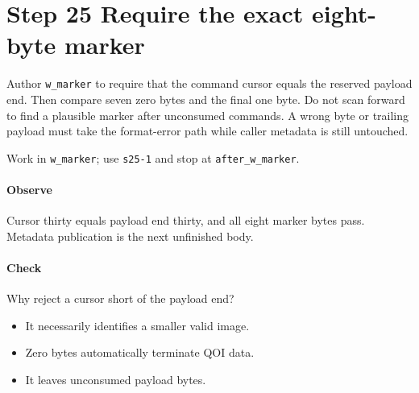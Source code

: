 \section{Step 25 Require the exact eight-byte marker}\label{qoi-s25}
Author \texttt{w\_marker} to require that the command cursor equals the reserved payload end. Then compare seven zero bytes and the final one byte. Do not scan forward to find a plausible marker after unconsumed commands. A wrong byte or trailing payload must take the format-error path while caller metadata is still untouched.

Work in \texttt{w\_marker}; use \texttt{s25-1} and stop at \texttt{after\_w\_marker}.

\paragraph{Observe} Cursor thirty equals payload end thirty, and all eight marker bytes pass. Metadata publication is the next unfinished body.

\paragraph{Check} Why reject a cursor short of the payload end?
\begin{itemize}
  \item[A.] It necessarily identifies a smaller valid image.
  \item[B.] Zero bytes automatically terminate QOI data.
  \item[C.] It leaves unconsumed payload bytes.
\end{itemize}
